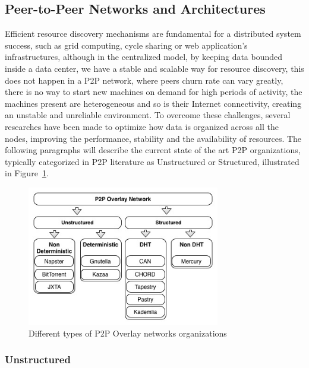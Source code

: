 \subsection{Peer-to-Peer Networks and Architectures}  
Efficient resource discovery mechanisms are fundamental for a distributed system success, such as grid computing, cycle sharing or web application's infrastructures\cite{Ranjan2006}, although in the centralized model, by keeping data bounded inside a data center, we have a stable and scalable way for resource discovery, this does not happen in a P2P network, where peers churn rate can vary greatly, there is no way to start new machines on demand for high periods of activity, the machines present are heterogeneous and so is their Internet connectivity, creating an unstable and unreliable environment. To overcome these challenges, several researches have been made to optimize how data is organized across all the nodes, improving the performance, stability and the availability of resources. The following paragraphs will describe the current state of the art P2P organizations, typically categorized in P2P literature as Unstructured or Structured\cite{Milojicic2003}, illustrated in Figure~\ref{fig:Different types of P2P Overlay networks organizations}.

\begin{figure}[bh!]
  \begin{center}
    \includegraphics[width=0.75\textwidth]{./img/p2porganizations.jpg}
  \end{center}
  \caption{Different types of P2P Overlay networks organizations}
  \label{fig:Different types of P2P Overlay networks organizations}
\end{figure}


\subsubsection{Unstructured}\label{par:Unstructured}

